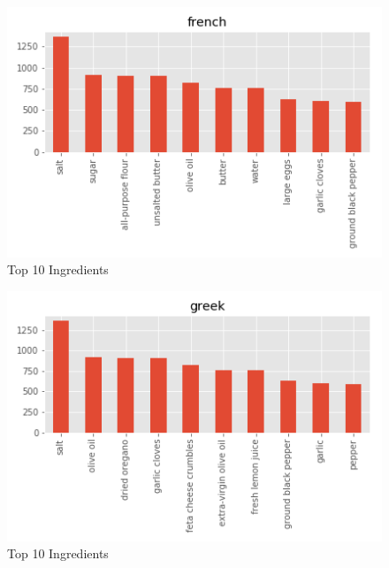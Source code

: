 \documentclass[sigconf]{acmart}
\begin{document}
\begin{figure}[!ht]
  \centering\includegraphics[width=\columnwidth]{images/french_10_most_used_ingredients.png}
  \caption{Top 10 Ingredients }\label{f:french_10_most_used_ingredients}
\end{figure}

\begin{figure}[!ht]
  \centering\includegraphics[width=\columnwidth]{images/greek_10_most_used_ingredients.png}
  \caption{Top 10 Ingredients }\label{f:greek_10_most_used_ingredients}
\end{figure}
\end{document}
